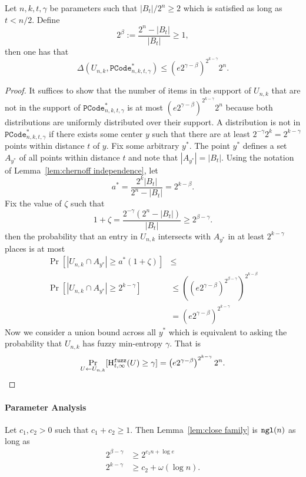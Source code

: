 \begin{lemma}
 \label{lem:close family}
Let $n, k, t, \gamma$ be parameters such that $|B_t|/2^n\ge 2$ which is satisfied as long as $t< n/2 $. Define \[2^\beta:=\frac{2^n-|B_t|}{|B_t|}\ge 1,\] then one has that 
\[\Delta(U_{n,k}, \mathtt{PCode}_{n, k, t, \gamma}^{*}) \le \left(e2^{\gamma-\beta}\right)^{2^{k-\gamma}}2^n.\]
\end{lemma}
\begin{proof}
It suffices to show that the number of items in the support of $U_{n,k}$ that are not in the support of $\mathtt{PCode}_{n, k, t, \gamma}^{*}$ is at most $\left(e2^{\gamma-\beta}\right)^{2^{k-\gamma}}2^n$ because both distributions are uniformly distributed over their support.  A distribution is not in $\mathtt{PCode}_{n, k, t, \gamma}^{*}$ if there exists some center $y$ such that there are at least $2^{-\gamma}2^k = 2^{k-\gamma}$ points within distance $t$ of $y$.  Fix some arbitrary $y^*$. The point $y^*$ defines a set $A_{y^*}$ of all points within distance $t$ and note that $|A_{y^*}| = |B_t|$.  Using the notation of Lemma~\ref{lem:chernoff independence}, let 
\[
a^* =\frac{2^k|B_t|}{2^n - |B_t|}=2^{k-\beta}.
\]
Fix the value of $\zeta$ such that 
\[1+\zeta = \frac{2^{-\gamma}(2^n - |B_t|)}{|B_t|} \ge 2^{\beta-\gamma}. \]
then the probability that an entry in $U_{n,k}$ intersects with $A_{y^*}$ in at least $2^{k-\gamma}$ places is at most 
\begin{align*}
\Pr[|U_{n,k} \cap A_{y^*}| \ge a^*(1+\zeta)] &\le \\
\Pr[| U_{n,k} \cap A_{y^*} | \ge 2^{k-\gamma}] &\le \left(\left(e2^{\gamma-\beta}\right)^{2^{\beta-\gamma}}\right)^{2^{k-\beta}} \\&= \left(e2^{\gamma-\beta}\right)^{2^{k-\gamma}}
\end{align*}
Now we consider a union bound across all $y^*$ which is equivalent to asking the probability that $U_{n,k}$ has fuzzy min-entropy $\gamma$.  That is
\[
\Pr_{U\leftarrow U_{n,k}}[\mathrm{H}^{\mathtt{fuzz}}_{t,\infty}(U)\ge \gamma] = \left(e2^{\gamma-\beta}\right)^{2^{k-\gamma}}2^n.
\]
\end{proof}

\paragraph{Parameter Analysis}

Let $c_1, c_2>0$ such that $c_1+c_2\ge 1$.  Then Lemma~\ref{lem:close family} is $\mathtt{ngl}(n)$ as long as 
\begin{align*}2^{\beta-\gamma}&\ge 2^{c_1n+\log e}\\
2^{k-\gamma}&\ge c_2+\omega(\log n).
\end{align*}




